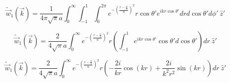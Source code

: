 \documentclass[double,12pt]{beavtex}
\begin{document}


\begin{equation}{\widetilde{\vec{w}}_1(\vec{k})=\frac{1}{4\pi\sqrt{\pi}a}\int_{0}^{\infty}\int_{-1}^{1}\int_{0}^{2\pi}e^{-\left(\frac{r-\frac{\alpha}{2}}{a}\right)^2}r\cos{\theta}'e^{ikr\cos\theta'}d{r}d{\cos\theta'}d{\phi'}{~}\hat{z}'}\end{equation}

\begin{equation}{\widetilde{\vec{w}}_1(\vec{k})=\frac{2}{4\sqrt{\pi}a}\int_{0}^{\infty}e^{-\left(\frac{r-\frac{\alpha}{2}}{a}\right)^2}r\left(\int_{-1}^{1}e^{ikr\cos\theta'}\cos{\theta}'d{\cos\theta'}\right)d{r}{~}\hat{z}'}\end{equation}

\begin{equation}{\widetilde{\vec{w}}_1(\vec{k})=\frac{2}{4\sqrt{\pi}a}\int_{0}^{\infty}e^{-\left(\frac{r-\frac{\alpha}{2}}{a}\right)^2}r\left(-\frac{2i}{kr}\cos(kr)+\frac{2i}{k^2r^2}\sin(kr)\right)d{r}{~}\hat{z}'}\end{equation}
\end{document}
